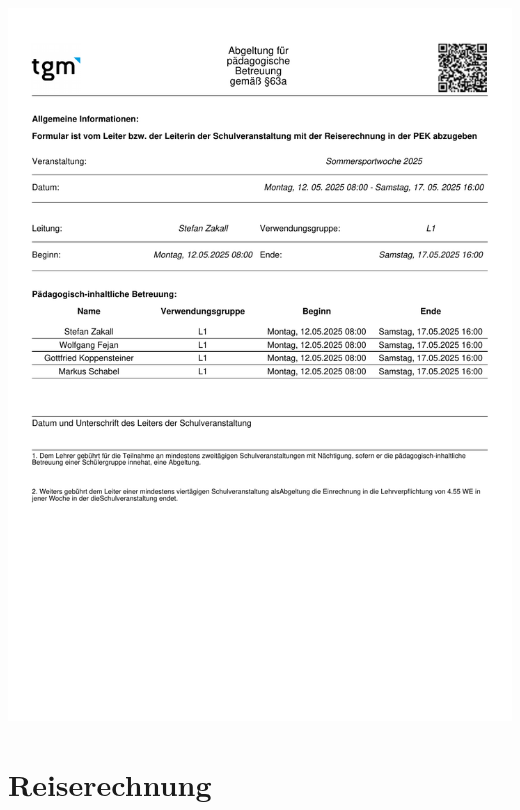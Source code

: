 %


\begin{center}
	\includegraphics[width=\linewidth]{chapters/appendix/compensation_for_educational_support}
\end{center}


\section*{Reiserechnung}
{}

%


